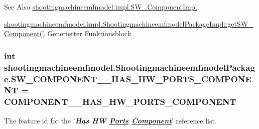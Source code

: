 \begin{DoxySeeAlso}{See Also}
\hyperlink{classshootingmachineemfmodel_1_1impl_1_1_s_w___component_impl}{shootingmachineemfmodel.\-impl.\-S\-W\-\_\-\-Component\-Impl} 

\hyperlink{classshootingmachineemfmodel_1_1impl_1_1_shootingmachineemfmodel_package_impl_aea506b8692fe0c081070fce6bd9295f7}{shootingmachineemfmodel.\-impl.\-Shootingmachineemfmodel\-Package\-Impl\-::get\-S\-W\-\_\-\-Component()} Generierter Funktionsblock 
\end{DoxySeeAlso}
\hypertarget{interfaceshootingmachineemfmodel_1_1_shootingmachineemfmodel_package_a2145621f1368f92f68bf6515af2bedb6}{
\subsubsection[{S\-W\-\_\-\-C\-O\-M\-P\-O\-N\-E\-N\-T\-\_\-\-\_\-\-H\-A\-S\-\_\-\-H\-W\-\_\-\-P\-O\-R\-T\-S\-\_\-\-C\-O\-M\-P\-O\-N\-E\-N\-T}]{\setlength{\rightskip}{0pt plus 5cm}int shootingmachineemfmodel.\-Shootingmachineemfmodel\-Package.\-S\-W\-\_\-\-C\-O\-M\-P\-O\-N\-E\-N\-T\-\_\-\-\_\-\-H\-A\-S\-\_\-\-H\-W\-\_\-\-P\-O\-R\-T\-S\-\_\-\-C\-O\-M\-P\-O\-N\-E\-N\-T = {\bf C\-O\-M\-P\-O\-N\-E\-N\-T\-\_\-\-\_\-\-H\-A\-S\-\_\-\-H\-W\-\_\-\-P\-O\-R\-T\-S\-\_\-\-C\-O\-M\-P\-O\-N\-E\-N\-T}}}\label{interfaceshootingmachineemfmodel_1_1_shootingmachineemfmodel_package_a2145621f1368f92f68bf6515af2bedb6}
The feature id for the '{\itshape {\bfseries Has H\-W \hyperlink{interfaceshootingmachineemfmodel_1_1_ports}{Ports} \hyperlink{interfaceshootingmachineemfmodel_1_1_component}{Component}}}' reference list.

